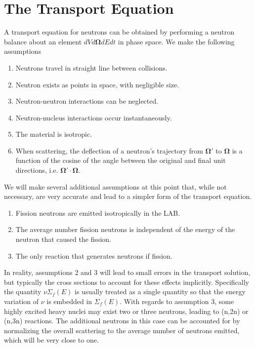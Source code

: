 \documentclass[11pt]{article}
\renewcommand\vec{\mathbf}
\begin{document}
\section{The Transport Equation}
\label{sec:orgheadline10}
A transport equation for neutrons can be obtained by performing a neutron balance about an element \(dV d\vec{\Omega} dE dt\) in phase space.  We make the following assumptions
\begin{enumerate}
\item Neutrons travel in straight line between collisions.
\item Neutron exists as points in space, with negligible size.
\item Neutron-neutron interactions can be neglected.
\item Neutron-nucleus interactions occur instantaneously.
\item The material is isotropic.
\item When scattering, the deflection of a neutron's trajectory from \(\vec{\Omega}'\) to \(\vec{\Omega}\) is a function of the cosine of the angle between the original and final unit directions, i.e. \(\vec{\Omega}' \cdot \vec{\Omega}\).
\end{enumerate}

We will make several additional assumptions at this point that, while not necessary, are very accurate and lead to a simpler form of the transport equation.
\begin{enumerate}
\item Fission neutrons are emitted isotropically in the LAB.
\item The average number fission neutrons is independent of the energy of the neutron that caused the fission.
\item The only reaction that generates neutrons if fission.
\end{enumerate}
In reality, assumptions 2 and 3 will lead to small errors in the transport solution, but typically the cross sections to account for these effects implicitly.  Specifically the quantity \(\nu\Sigma_f(E)\) is usually treated as a single quantity so that the energy variation of \(\nu\) is embedded in \(\Sigma_f(E)\).  With regards to assumption 3, some highly excited heavy nuclei may exist two or three neutrons, leading to (n,2n) or (n,3n) reactions.  The additional neutrons in this case can be accounted for by normalizing the overall scattering to the average number of neutrons emitted, which will be very close to one.
\end{document}
